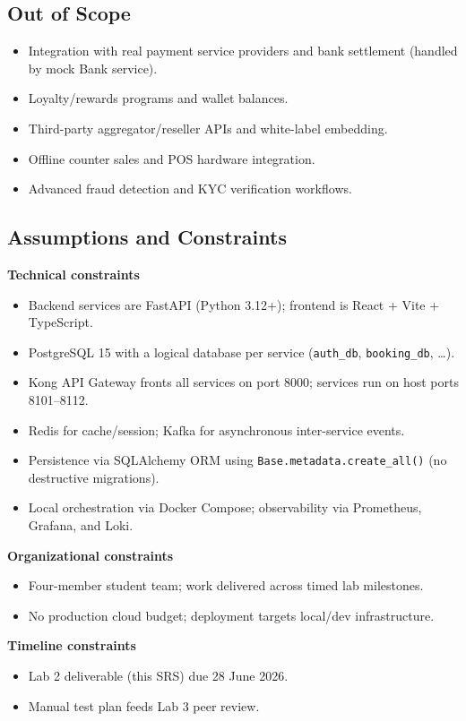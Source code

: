 \documentclass[11pt,a4paper]{article}
\begin{document}
\subsection{Out of Scope}
\begin{itemize}[leftmargin=1.4em]
  \item Integration with real payment service providers and bank settlement (handled by mock Bank service).
  \item Loyalty/rewards programs and wallet balances.
  \item Third-party aggregator/reseller APIs and white-label embedding.
  \item Offline counter sales and POS hardware integration.
  \item Advanced fraud detection and KYC verification workflows.
\end{itemize}

\subsection{Assumptions and Constraints}
\textbf{Technical constraints}
\begin{itemize}[leftmargin=1.4em]
  \item Backend services are FastAPI (Python 3.12+); frontend is React + Vite + TypeScript.
  \item PostgreSQL 15 with a logical database per service (\texttt{auth\_db}, \texttt{booking\_db}, \dots).
  \item Kong API Gateway fronts all services on port 8000; services run on host ports 8101--8112.
  \item Redis for cache/session; Kafka for asynchronous inter-service events.
  \item Persistence via SQLAlchemy ORM using \texttt{Base.metadata.create\_all()} (no destructive migrations).
  \item Local orchestration via Docker Compose; observability via Prometheus, Grafana, and Loki.
\end{itemize}
\textbf{Organizational constraints}
\begin{itemize}[leftmargin=1.4em]
  \item Four-member student team; work delivered across timed lab milestones.
  \item No production cloud budget; deployment targets local/dev infrastructure.
\end{itemize}
\textbf{Timeline constraints}
\begin{itemize}[leftmargin=1.4em]
  \item Lab 2 deliverable (this SRS) due 28 June 2026.
  \item Manual test plan feeds Lab 3 peer review.
\end{itemize}
\end{document}
